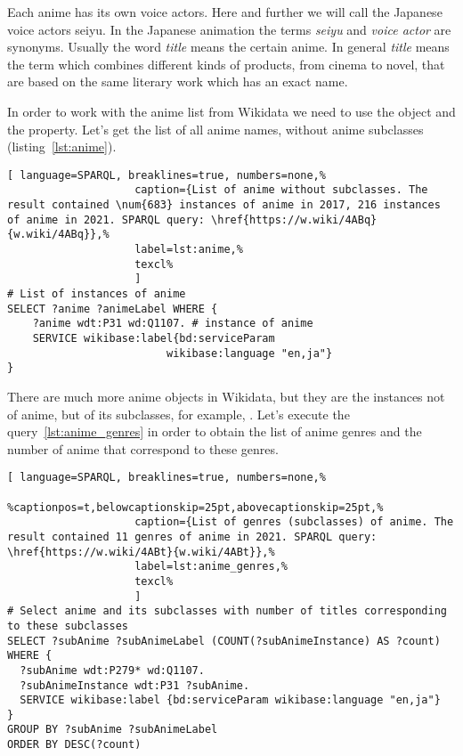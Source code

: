 Each anime has its own voice actors. Here and further we will call the Japanese voice actors seiyu. In the Japanese animation the terms \emph{seiyu} and \emph{voice actor} are synonyms. Usually the word \emph{title} means the certain anime. In general \emph{title} means the term which combines different kinds of products, from cinema to novel, that are based on the same literary work which has an exact name.

In order to work with the anime list from Wikidata we need to use the  object and the  property. Let's get the list of all anime names, without anime subclasses (listing~\ref{lst:anime}).

\begin{lstlisting}[ language=SPARQL, breaklines=true, numbers=none,%
                    caption={List of anime without subclasses. The result contained \num{683} instances of anime in 2017, 216 instances of anime in 2021. SPARQL query: \href{https://w.wiki/4ABq}{w.wiki/4ABq}},%
                    label=lst:anime,%
                    texcl%
                    ]
# List of instances of anime
SELECT ?anime ?animeLabel WHERE {
    ?anime wdt:P31 wd:Q1107. # instance of anime
    SERVICE wikibase:label{bd:serviceParam
					     wikibase:language "en,ja"}
}
\end{lstlisting}%

There are much more anime objects in Wikidata, but they are the instances not of anime, but of its subclasses, for example, . Let's execute the query~\ref{lst:anime_genres} in order to obtain the list of anime genres and the number of anime that correspond to these genres.

\begin{widepar}%
	\captionsetup[lstlisting]{%
        format=llapwide18 %
	}%
\begin{lstlisting}[ language=SPARQL, breaklines=true, numbers=none,%
                    %captionpos=t,belowcaptionskip=25pt,abovecaptionskip=25pt,%
                    caption={List of genres (subclasses) of anime. The result contained 11 genres of anime in 2021. SPARQL query: \href{https://w.wiki/4ABt}{w.wiki/4ABt}},%
                    label=lst:anime_genres,%
                    texcl%
                    ]
# Select anime and its subclasses with number of titles corresponding to these subclasses
SELECT ?subAnime ?subAnimeLabel (COUNT(?subAnimeInstance) AS ?count) WHERE {
  ?subAnime wdt:P279* wd:Q1107.
  ?subAnimeInstance wdt:P31 ?subAnime.
  SERVICE wikibase:label {bd:serviceParam wikibase:language "en,ja"}
}
GROUP BY ?subAnime ?subAnimeLabel
ORDER BY DESC(?count)
\end{lstlisting}%
\end{widepar}%

